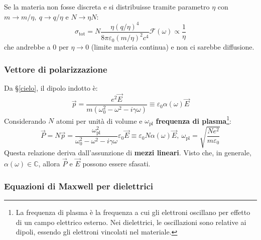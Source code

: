 \documentclass[10pt, a4paper]{scrartcl}
\numberwithin{equation}{subsection}
\theoremstyle{style1}
\begin{document}
Se la materia non fosse discreta e si distribuisse tramite parametro $\eta$ con $m\to m / \eta, \ q\to q / \eta$ e $N\to \eta N$:
\begin{equation}
	\sigma _\text{tot}= N \frac{\eta (q / \eta)^4}{8\pi\varepsilon _0 (m / \eta)^2 c^4}\mathcal{F}(\omega)\propto \frac{1}{\eta}
\end{equation}
che andrebbe a $0$ per $\eta \to 0$ (limite materia continua) e non ci sarebbe diffusione.
\subsubsection{Vettore di polarizzazione}

Da \S\ref{cielo}, il dipolo indotto \`e:
\begin{equation}
	\vec{p} = \frac{e^2 \vec{E}}{m(\omega_0^2 - \omega^2 - i \gamma\omega)}\equiv \varepsilon _0 \alpha (\omega) \vec{E}
\end{equation}
Considerando $N$ atomi per unit\`a di volume e $\omega_\text{pl}$ \textbf{frequenza di plasma}\footnote{La frequenza di plasma \`e la frequenza a cui gli elettroni oscillano per effetto di un campo elettrico esterno. Nei dielettrici, le oscillazioni sono relative ai dipoli, essendo gli elettroni vincolati nel materiale.}:
\begin{equation}
	\vec{P}= N\vec{p}= \frac{\omega_\text{pl}^2}{\omega_0^2 -\omega^2 - i\gamma\omega}\varepsilon _0 \vec{E}\equiv \varepsilon _0 N \alpha (\omega) \vec{E},\ \omega_\text{pl}=\sqrt{\frac{Ne^2 }{m \varepsilon _0}} 
\end{equation}
Questa relazione deriva dall'assunzione di \textbf{mezzi lineari}. Visto che, in generale, $\alpha (\omega) \in \mathbb{C}$, allora $\vec{P}$ e $\vec{E}$ possono essere sfasati.
\subsubsection{Equazioni di Maxwell per dielettrici}
\end{document}
